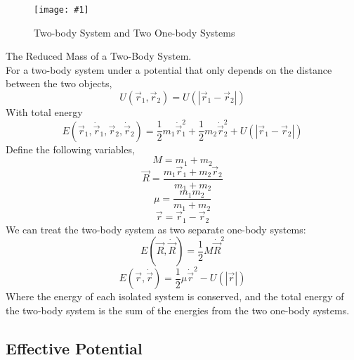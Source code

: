 \documentclass[11pt]{article}
\newcommand{\fig}[4]{
    \begin{figure}[H]
        \centering
        \texttt{[image: \#1]}
        \caption{#2}
        \label{exp4fit}
    \end{figure}
}
\theoremstyle{gangnamstyle}{\newtheorem{definition}{Definition}[]}
\theoremstyle{gangnamstyle}{\newtheorem{example}{Example}[]}
\theoremstyle{gangnamstyle}{\newtheorem{problem}{Problem}[]}
\theoremstyle{gangnamstyle}{\newtheorem{warning}{Warning}[]}
\begin{document}
\fig{figs/n5/systems.jpeg}{Two-body System and Two One-body Systems}{0.2}{0}

\begin{definition}
The Reduced Mass of a Two-Body System. \\
For a two-body system under a potential that only depends on the distance between the two objects, 
\begin{equation}
U(\Vec{r}_1, \Vec{r}_2) = U(|\Vec{r}_1 - \Vec{r}_2|)
\end{equation}
With total energy
\begin{equation}
E(\Vec{r}_1, \Dot{\Vec{r}}_1, \Vec{r}_2, \Dot{\Vec{r}}_2) = \frac{1}{2}m_1\Dot{\Vec{r}}_1^2 + \frac{1}{2}m_2\Dot{\Vec{r}}_2^2 + U(|\Vec{r}_1 - \Vec{r}_2|)
\end{equation}
Define the following variables, 
\begin{equation}
M = m_1 + m_2
\end{equation}
\begin{equation}
\Vec{R} = \frac{m_1\Vec{r}_1 + m_2\Vec{r}_2}{m_1 + m_2}
\end{equation}
\begin{equation}
\mu = \frac{m_1m_2}{m_1 + m_2}
\end{equation}
\begin{equation}
\Vec{r} = \Vec{r}_1 - \Vec{r}_2
\end{equation}
We can treat the two-body system as two separate one-body systems: 
\begin{equation}
E(\Vec{R}, \Dot{\Vec{R}}) = \frac{1}{2} M\Dot{\Vec{R}}^2
\end{equation}
\begin{equation}
E(\Vec{r}, \Dot{\Vec{r}}) = \frac{1}{2}\mu\Dot{\Vec{r}}^2 - U(|\Vec{r}|)
\end{equation}
Where the energy of each isolated system is conserved, and the total energy of the two-body system is the sum of the energies from the two one-body systems. 
\end{definition}

\subsection{Effective Potential}
\end{document}

